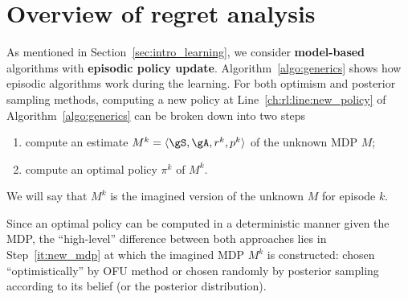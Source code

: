\section{Overview of regret analysis}

As mentioned in Section~\ref{sec:intro_learning}, we consider \textbf{model-based} algorithms with \textbf{episodic policy update}.
Algorithm~\ref{algo:generics} shows how episodic algorithms work during the learning.
For both optimism and posterior sampling methods, computing a new policy at Line~\ref{ch:rl:line:new_policy} of Algorithm~\ref{algo:generics} can be broken down into two steps
\begin{enumerate}[label=(\roman*)]
    \item \label{it:new_mdp} compute an estimate $M^k=\langle\gS,\gA,r^k,p^k\rangle$ of the unknown MDP $M$;
    \item compute an optimal policy $\pi^k$ of $M^k$.
\end{enumerate}
We will say that $M^k$ is the imagined version of the unknown $M$ for episode $k$.

Since an optimal policy can be computed in a deterministic manner given the MDP, the ``high-level'' difference between both approaches lies in Step~\ref{it:new_mdp} at which the imagined MDP $M^k$ is constructed: chosen ``optimistically'' by OFU method or chosen randomly by posterior sampling according to its belief (or the posterior distribution).


